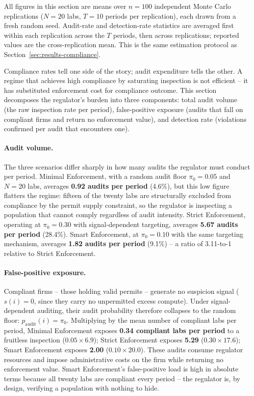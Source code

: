 All figures in this section are means over $n = 100$ independent Monte Carlo replications ($N = 20$ labs, $T = 10$ periods per replication), each drawn from a fresh random seed. Audit-rate and detection-rate statistics are averaged first within each replication across the $T$ periods, then across replications; reported values are the cross-replication mean. This is the same estimation protocol as Section~\ref{sec:results-compliance}.

Compliance rates tell one side of the story; audit expenditure tells the other. A regime that achieves high compliance by saturating inspection is not efficient -- it has substituted enforcement cost for compliance outcome. This section decomposes the regulator's burden into three components: total audit volume (the raw inspection rate per period), false-positive exposure (audits that fall on compliant firms and return no enforcement value), and detection rate (violations confirmed per audit that encounters one).

\paragraph{Audit volume.}

The three scenarios differ sharply in how many audits the regulator must conduct per period. Minimal Enforcement, with a random audit floor $\pi_0 = 0.05$ and $N = 20$ labs, averages \textbf{0.92 audits per period} (4.6\%), but this low figure flatters the regime: fifteen of the twenty labs are structurally excluded from compliance by the permit supply constraint, so the regulator is inspecting a population that cannot comply regardless of audit intensity. Strict Enforcement, operating at $\pi_0 = 0.30$ with signal-dependent targeting, averages \textbf{5.67 audits per period} (28.4\%). Smart Enforcement, at $\pi_0 = 0.10$ with the same targeting mechanism, averages \textbf{1.82 audits per period} (9.1\%) -- a ratio of 3.11-to-1 relative to Strict Enforcement.

\paragraph{False-positive exposure.}

Compliant firms -- those holding valid permits -- generate no suspicion signal ($s(i) = 0$, since they carry no unpermitted excess compute). Under signal-dependent auditing, their audit probability therefore collapses to the random floor: $p_{\mathrm{audit}}(i) = \pi_0$. Multiplying by the mean number of compliant labs per period, Minimal Enforcement exposes \textbf{0.34 compliant labs per period} to a fruitless inspection ($0.05 \times 6.9$); Strict Enforcement exposes \textbf{5.29} ($0.30 \times 17.6$); Smart Enforcement exposes \textbf{2.00} ($0.10 \times 20.0$). These audits consume regulator resources and impose administrative costs on the firm while returning no enforcement value. Smart Enforcement's false-positive load is high in absolute terms because all twenty labs are compliant every period -- the regulator is, by design, verifying a population with nothing to hide.

